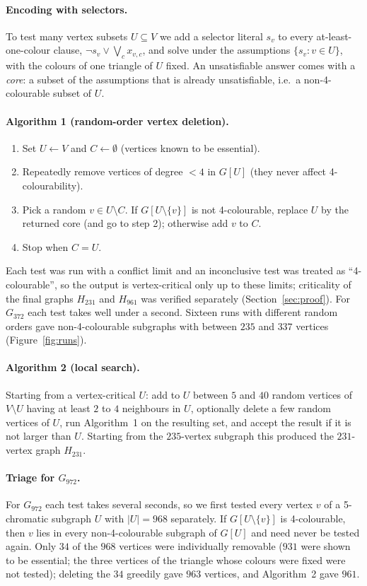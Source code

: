 \documentclass[11pt]{article}
\renewcommand{\_}{\textunderscore\allowbreak}
\theoremstyle{remark}
\begin{document}
\paragraph{Encoding with selectors.} To test many vertex subsets $U\subseteq V$ we add a selector literal
$s_v$ to every at-least-one-colour clause, $\neg s_v\vee\bigvee_c x_{v,c}$, and solve under the
assumptions $\{s_v:v\in U\}$, with the colours of one triangle of $U$ fixed. An unsatisfiable answer comes
with a \emph{core}: a subset of the assumptions that is already unsatisfiable, i.e.\ a non-4-colourable
subset of $U$.

\paragraph{Algorithm 1 (random-order vertex deletion).}
\begin{enumerate}
\item Set $U\leftarrow V$ and $C\leftarrow\emptyset$ (vertices known to be essential).
\item Repeatedly remove vertices of degree $<4$ in $G[U]$ (they never affect 4-colourability).
\item Pick a random $v\in U\setminus C$. If $G[U\setminus\{v\}]$ is not 4-colourable, replace $U$ by the
returned core (and go to step 2); otherwise add $v$ to $C$.
\item Stop when $C=U$.
\end{enumerate}
Each test was run with a conflict limit and an inconclusive test was treated as ``4-colourable'', so the
output is vertex-critical only up to these limits; criticality of the final graphs $H_{231}$ and $H_{961}$
was verified separately (Section~\ref{sec:proof}).
For $G_{372}$ each test takes well under a second. Sixteen runs with different random orders gave
non-4-colourable subgraphs with between $235$ and $337$ vertices (Figure~\ref{fig:runs}).

\paragraph{Algorithm 2 (local search).} Starting from a vertex-critical $U$: add to $U$ between $5$ and $40$
random vertices of $V\setminus U$ having at least $2$ to $4$ neighbours in $U$, optionally delete a few
random vertices of $U$, run Algorithm~1 on the resulting set, and accept the result if it is not larger
than $U$. Starting from the $235$-vertex subgraph this produced the $231$-vertex graph $H_{231}$.

\paragraph{Triage for $G_{972}$.} For $G_{972}$ each test takes several seconds, so we first tested every
vertex $v$ of a 5-chromatic subgraph $U$ with $|U|=968$ separately. If $G[U\setminus\{v\}]$ is
4-colourable, then $v$ lies in every non-4-colourable subgraph of $G[U]$ and need never be tested again.
Only $34$ of the $968$ vertices were individually removable ($931$ were shown to be essential; the three
vertices of the triangle whose colours were fixed were not tested); deleting the $34$ greedily gave $963$
vertices, and Algorithm~2 gave $961$.
\end{document}
